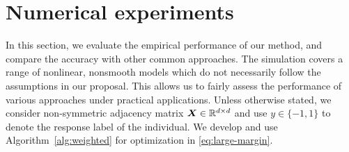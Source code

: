 \documentclass[11pt]{article}
\theoremstyle{definition}
\begin{document}




\vspace{-.5cm}
\section{Numerical experiments}\label{sec:data}
\vspace{-.3cm}
In this section, we evaluate the empirical performance of our method, and compare the accuracy with other common approaches. The simulation covers a range of nonlinear, nonsmooth models which do not necessarily follow the assumptions in our proposal. This allows us to fairly assess the performance of various approaches under practical applications. Unless otherwise stated, we consider non-symmetric adjacency matrix $\bm X\in\mathbb{R}^{d\times d}$ and use $y\in\{-1,1\}$ to denote the response label of the individual.  We develop and use Algorithm~\ref{alg:weighted} for optimization in \eqref{eq:large-margin}. 
\end{document}
